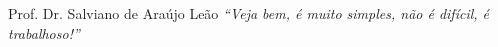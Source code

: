 
\begin{epigrafe}{Prof. Dr. Salviano de Araújo Leão}
\textit{``Veja bem, é muito simples, não é difícil, é trabalhoso!''}
\end{epigrafe}